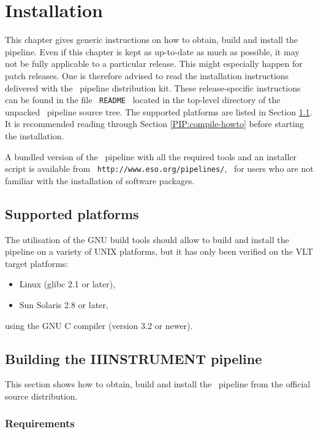\section{Installation}
\label{installation}

This chapter gives generic instructions on how to obtain, build and install
the \instname\, pipeline. Even if this chapter is kept as up-to-date as much as 
possible, it may not be fully applicable to a particular release. This might
especially happen for patch releases. One is therefore advised to read the 
installation instructions delivered with the \instname\, pipeline distribution kit.
These release-specific instructions can be found in the file \ \texttt{README}
\ located in the top-level directory of the unpacked \instname\, pipeline source 
tree. The supported platforms are listed in Section \ref{PIP:platforms}. 
It is recommended reading through Section \ref{PIP:compile-howto} 
before starting the installation.

A bundled version of the \instname\, pipeline with all the required tools 
and an installer script is available from 
\ \texttt{http://www.eso.org/pipelines/}, \ for users 
who are not familiar with the installation of software packages.


\subsection{Supported platforms}
\label{PIP:platforms}

The utilisation of the GNU build tools should allow to build and install
the \instname\, pipeline on a variety of UNIX platforms, but it has only been
verified on the VLT target platforms:
\begin{itemize}
  \item Linux (glibc 2.1 or later),
  \item Sun Solaris 2.8 or later,
\end{itemize}
using the GNU C compiler (version 3.2 or newer).


\subsection{Building the IIINSTRUMENT pipeline}

This section shows how to obtain, build and install the \instname\, pipeline 
from the official source distribution.

\subsubsection{Requirements}
\label{PIP:requirements}

